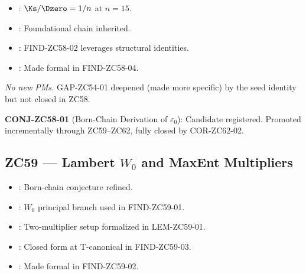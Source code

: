 \documentclass[12pt, a4paper]{article}
\begin{document}
\begin{inheritbox}[title={ZC58 Backward Inheritance}]
\begin{itemize}[leftmargin=1.5em]
\item {}: $\Ks/\Dzero=1/n$ at $n=15$.
\item {}: Foundational chain inherited.
\item {}:
  FIND-ZC58-02 leverages structural identities.
\item {}: Made formal
  in FIND-ZC58-04.
\end{itemize}
\end{inheritbox}

\begin{correctionbox}[title={ZC58 Forward Corrections / PMs}]
\textit{No new PMs.} GAP-ZC54-01 deepened (made more specific) by
the seed identity but not closed in ZC58.
\end{correctionbox}

\begin{conmapbox}[title={ZC58 Candidate Record}]
\textbf{CONJ-ZC58-01} (Born-Chain Derivation of $\varepsilon_0$):
Candidate registered. Promoted incrementally through ZC59--ZC62,
fully closed by COR-ZC62-02.
\end{conmapbox}

\subsection{ZC59 --- Lambert $W_{0}$ and MaxEnt Multipliers}

\begin{inheritbox}[title={ZC59 Backward Inheritance}]
\begin{itemize}[leftmargin=1.5em]
\item {}: Born-chain
  conjecture refined.
\item {}:
  $W_{0}$ principal branch used in FIND-ZC59-01.
\item {}:
  Two-multiplier setup formalized in LEM-ZC59-01.
\item {}:
  Closed form at T-canonical in FIND-ZC59-03.
\item {}: Made formal in FIND-ZC59-02.
\end{itemize}
\end{inheritbox}
\end{document}
